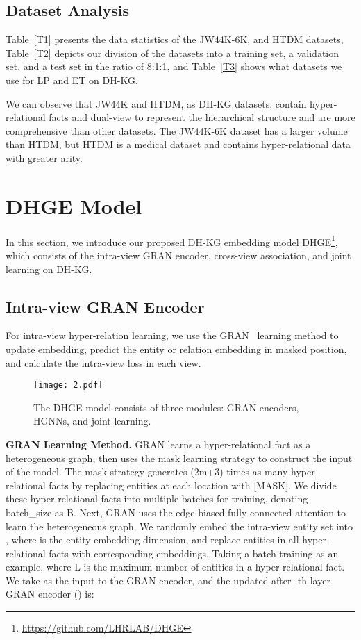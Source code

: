 \documentclass[letterpaper]{article} \usepackage{aaai23}  \usepackage{times}  \usepackage{helvet}  \usepackage{courier}  \usepackage[hyphens]{url}  \usepackage{graphicx} \urlstyle{rm} \def\UrlFont{\rm}  \usepackage{natbib}  \usepackage{caption} \frenchspacing  \setlength{\pdfpagewidth}{8.5in}  \setlength{\pdfpageheight}{11in}  \usepackage{times}
\begin{document}
\subsection{Dataset Analysis}

Table~\ref{T1} presents the data statistics of the JW44K-6K, and HTDM datasets, Table~\ref{T2} depicts our division of the datasets into a training set, a validation set, and a test set in the ratio of 8:1:1,  and Table~\ref{T3} shows what datasets we use for LP and ET on DH-KG.

We can observe that JW44K and HTDM, as DH-KG datasets, contain hyper-relational facts and dual-view to represent the hierarchical structure and are more comprehensive than other datasets. The JW44K-6K dataset has a larger volume than HTDM, but HTDM is a medical dataset and contains hyper-relational data with greater arity.



\section{DHGE Model}
\label{s5}

In this section, we introduce our proposed DH-KG embedding model DHGE\footnote{\url{https://github.com/LHRLAB/DHGE}}, which consists of the intra-view GRAN encoder, cross-view association, and joint learning on DH-KG.

\subsection{Intra-view GRAN Encoder }

For intra-view hyper-relation learning, we use the GRAN~\citep{GRAN} learning method to update embedding, predict the entity or relation embedding in masked position, and calculate the intra-view loss in each view.

\begin{figure*}
    \centering
    \texttt{[image: 2.pdf]}
    \caption{The DHGE model consists of three modules: GRAN encoders, HGNNs, and joint learning.}
    \label{fig:my_label}
\end{figure*}

\textbf{GRAN Learning Method.} GRAN learns a hyper-relational fact  as a heterogeneous graph, then uses the mask learning strategy to construct the input of the model. The mask strategy generates (2m+3) times as many hyper-relational facts by replacing entities at each location with [MASK]. We divide these hyper-relational facts into multiple batches for training, denoting batch\_size as B. Next, GRAN uses the edge-biased fully-connected attention to learn the heterogeneous graph. We randomly embed the intra-view entity set  into , where  is the entity embedding dimension, and replace entities in all hyper-relational facts with corresponding embeddings. Taking a batch  training as an example, where L is the maximum number of entities in a 
hyper-relational fact. We take  as the input to the GRAN encoder, and the updated  after -th layer GRAN encoder () is: 
\end{document}
